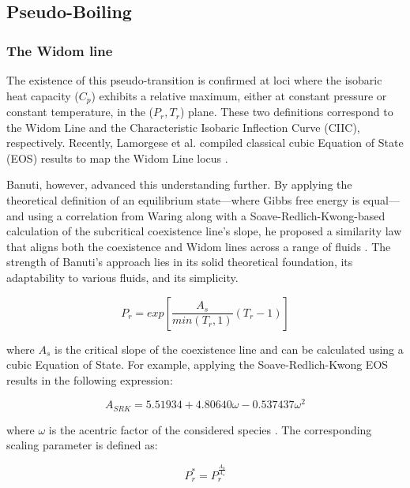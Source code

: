 	\subsection{Pseudo-Boiling} %
		\subsubsection{The Widom line}
		The existence of this pseudo-transition is confirmed at loci where the
		isobaric heat capacity ($C_p$) exhibits a relative maximum, either at
		constant pressure or constant temperature, in the ($P_r,T_r$) plane.
		These two definitions correspond to the Widom Line and the Characteristic
		Isobaric Inflection Curve (CIIC), respectively. Recently, Lamorgese et al.
		compiled classical cubic Equation of State (EOS) results to map the Widom
		Line locus \cite{lamorgese2018widom}.

		Banuti, however, advanced this understanding further. By applying the
		theoretical definition of an equilibrium state—where Gibbs free energy
		is equal—and using a correlation from Waring \cite{waring1954form} along
		with a Soave-Redlich-Kwong-based calculation of the subcritical
		coexistence line's slope, he proposed a similarity law that aligns both
		the coexistence and Widom lines across a range of fluids
		\cite{banuti2017similarity}. The strength of Banuti's approach lies in
		its solid theoretical foundation, its adaptability to various fluids,
		and its simplicity.

		\begin{equation}
			P_r = exp\left[\frac{A_s}{min(T_r,1)}(T_r-1)\right]
			\label{ReducePressureEquation}
		\end{equation}

		where $A_s$ is the critical slope of the coexistence line and can be
		calculated using a cubic Equation of State. For example, applying
		the Soave-Redlich-Kwong EOS results in the following expression:

		\begin{equation}
			A_{SRK} = 5.51934 + 4.80640\omega - 0.537437\omega^2
		\end{equation}
		
		where $\omega$ is the acentric factor of the considered species
		\cite{banuti2017similarity}. The corresponding scaling parameter is
		defined as:

		\begin{equation}
			P_r^* = P_r^{\frac{A_0}{A_s}}
		\end{equation}

